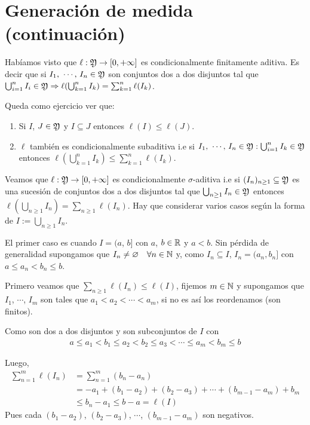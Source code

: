\section{Generación de medida (continuación)}

Habíamos visto que \(\ell : \mathfrak{Y} \to [0, +\infty]\) es condicionalmente finitamente aditiva.
Es decir que si \(I_1 \text{, } \cdots \text{, } I_n \in \mathfrak{Y}\) son conjuntos dos a dos disjuntos tal que
\(\bigcup_{i = 1}^n I_i \in \mathfrak{Y} \Rightarrow \ell(\bigcup_{k = 1}^n I_k) = \sum_{k = 1}^n \ell(I_k)\).

Queda como ejercicio ver que: \begin{enumerate}
    \item Si \(I\), \(J \in \mathfrak{Y}\) y \(I \subseteq J\) entonces \(\ell(I) \leq \ell(J)\).
    \item \(\ell\) también es condicionalmente subaditiva i.e si \(I_1 \text{, } \cdots \text{, } I_n \in \mathfrak{Y} : \bigcup_{i = 1}^n I_k \in \mathfrak{Y}\) entonces
          \(\ell(\bigcup_{k = 1}^n I_k) \leq \sum_{k = 1}^n \ell(I_k)\).
\end{enumerate}


Veamos que \(\ell: \mathfrak{Y} \to [0, +\infty]\) es condicionalmente \(\sigma\)-aditiva i.e si \((I_n)_{n \geq 1} \subseteq \mathfrak{Y}\) es una sucesión
de conjuntos dos a dos disjuntos tal que \(\bigcup_{n \geq 1} I_n \in \mathfrak{Y}\) entonces \(\ell(\bigcup_{n \geq 1} I_n) = \sum_{n \geq 1} \ell(I_n)\).
Hay que considerar varios casos según la forma de \(I := \bigcup_{n \geq 1} I_n\).

El primer caso es cuando \(I = (a\), \(b]\) con \(a\), \(b \in \mathbb{R}\) y \(a < b\).
Sin pérdida de generalidad supongamos que \(I_n \neq \varnothing \quad \forall n \in \mathbb{N}\) y, como \(I_n \subseteq I\),
\(I_n = (a_n, b_n]\) con \(a \leq a_n < b_n \leq b\).

Primero veamos que \(\sum_{n \geq 1} \ell(I_n) \leq \ell(I)\), fijemos \(m \in \mathbb{N}\) y supongamos que \(I_1\), \(\cdots\), \(I_m\) son tales que
\(a_1 < a_2 < \cdots < a_m\), si no es así los reordenamos (son finitos).

Como son dos a dos disjuntos y son subconjuntos de \(I\) con \begin{align*}
    a \leq a_1 < b_1 \leq a_2 < b_2 \leq a_3 < \cdots \leq a_m < b_m \leq b
\end{align*}

Luego, \begin{align*}
    \sum_{n = 1}^m \ell(I_n) & = \sum_{n = 1}^m (b_n - a_n)                                          \\
                             & = -a_1 + (b_1 - a_2) + (b_2 - a_3) + \cdots + (b_{m - 1} - a_m) + b_m \\
                             & \leq b_n - a_1 \leq b - a = \ell(I)
\end{align*} Pues cada \((b_1 - a_2)\), \((b_2 - a_3)\), \(\cdots\), \((b_{m - 1} - a_m)\) son negativos.

